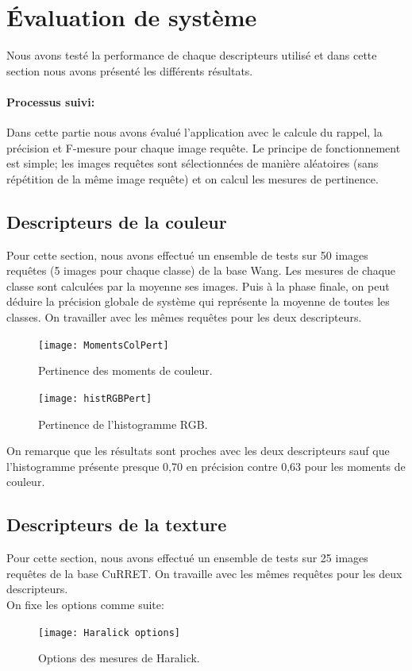 \section{Évaluation de système}
Nous avons testé la performance de chaque descripteurs utilisé et dans cette section nous avons présenté les différents résultats.

\paragraph{Processus suivi:}
Dans cette partie nous avons évalué l’application avec le calcule du rappel, la précision et F-mesure pour chaque image requête. Le principe de fonctionnement est simple; les images requêtes sont sélectionnées de manière aléatoires (sans répétition de la même image requête) et on calcul les mesures de pertinence. 
\subsection{Descripteurs de la couleur}
Pour cette section, nous avons effectué un ensemble de tests sur 50 images requêtes (5 images pour chaque classe) de la base Wang. Les mesures de chaque classe sont calculées par la moyenne ses images. Puis à la phase finale, on peut déduire la précision globale de système qui représente la moyenne de toutes les classes. On travailler avec les mêmes requêtes pour les deux descripteurs.

\begin{figure}[H]
	\centering
	\texttt{[image: MomentsColPert]} 
	\caption{Pertinence des moments de couleur.}
\end{figure}

\begin{figure}[H]
	\centering
	\texttt{[image: histRGBPert]} 
	\caption{Pertinence de l'histogramme RGB.}
\end{figure}
On remarque que les résultats sont proches avec les deux descripteurs sauf que l'histogramme présente presque 0,70 en précision contre 0,63 pour les moments de couleur.
\subsection{Descripteurs de la texture}
Pour cette section, nous avons effectué un ensemble de tests sur 25 images requêtes de la base CuRRET. On travaille avec les mêmes requêtes pour les deux descripteurs.\\
On fixe les options comme suite:
\begin{figure}[H]
	\centering
	\texttt{[image: Haralick options]} 
	\caption{Options des mesures de Haralick.}
\end{figure}


